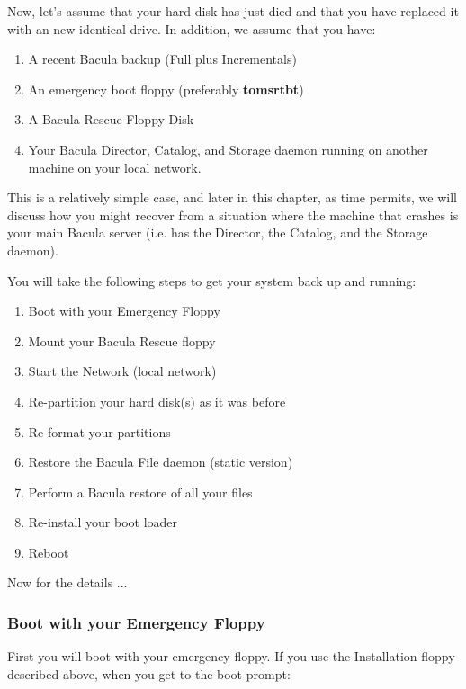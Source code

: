 Now, let's assume that your hard disk has just died and that you have replaced
it with an new identical drive. In addition, we assume that you have: 

\begin{enumerate}
\item A recent Bacula backup (Full plus Incrementals)  
\item An emergency boot floppy (preferably {\bf tomsrtbt})  
\item A Bacula Rescue Floppy Disk  
\item Your Bacula Director, Catalog, and Storage daemon running  on another
   machine on your local network. 
   \end{enumerate}

This is a relatively simple case, and later in this chapter, as time permits,
we will discuss how you might recover from a situation where the machine that
crashes is your main Bacula server (i.e. has the Director, the Catalog, and
the Storage daemon). 

You will take the following steps to get your system back up and running: 

\begin{enumerate}
\item Boot with your Emergency Floppy  
\item Mount your Bacula Rescue floppy  
\item Start the Network (local network)  
\item Re-partition your hard disk(s) as it was before  
\item Re-format your partitions  
\item Restore the Bacula File daemon (static version)  
\item Perform a Bacula restore of all your files  
\item Re-install your boot loader  
\item Reboot 
   \end{enumerate}

Now for the details ... 

\subsubsection*{Boot with your Emergency Floppy}

First you will boot with your emergency floppy. If you use the Installation
floppy described above, when you get to the boot prompt: 

